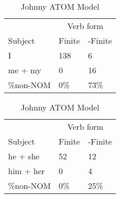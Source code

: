 \begin{table}[]
    \caption{Johnny ATOM Model}
    \begin{minipage}{0.5\textwidth}
    \centering
    \begin{tabular}{@{}lll@{}}
        \toprule
         &\multicolumn{2}{c}{Verb form}\\
         \cline{2-3}
        Subject & Finite & -Finite \\
        \midrule
        I & 138 & 6 \\
        me + my & 0 & 16 \\
        \hline
        \%non-NOM & 0\% & 73\% \\
        \bottomrule
    \end{tabular}
\end{minipage}
\begin{minipage}{0.5\textwidth}
    \centering
    \begin{tabular}{@{}lll@{}}
        \toprule
         &\multicolumn{2}{c}{Verb form}\\
         \cline{2-3}
        Subject & Finite & -Finite \\
        \midrule
        he + she & 52 & 12 \\
        him + her & 0 & 4 \\
        \hline
        \%non-NOM & 0\% & 25\% \\
        \bottomrule
    \end{tabular}
    \end{minipage}
    \begin{minipage}{0.5\textwidth}
    

\end{minipage}
\end{table}
